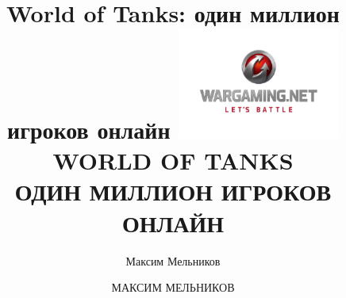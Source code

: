 \documentclass[aspectratio=169]{beamer}
\begin{document}
\title{World of Tanks: один миллион игроков онлайн}
\author{Максим Мельников}
\date{}

{
\title{
    \includegraphics[width=0.4\textwidth]{wg-logo.png}
    \\
    {\huge WORLD OF TANKS\\ \vspace{0.5em} ОДИН МИЛЛИОН ИГРОКОВ ОНЛАЙН}
}
\author{МАКСИМ МЕЛЬНИКОВ}
\begin{frame}[plain]{}
    \titlepage
\end{frame}
}

\end{document}
